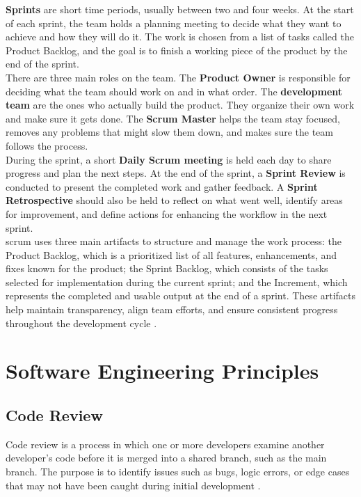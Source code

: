 \textbf{Sprints} are short time periods, usually between two and four weeks. At the start of each sprint, the team holds a planning meeting to decide what they want to achieve and how they will do it. The work is chosen from a list of tasks called the Product Backlog, and the goal is to finish a working piece of the product by the end of the sprint. \\

There are three main roles on the team. The \textbf{Product Owner} is responsible for deciding what the team should work on and in what order. The \textbf{development team} are the ones who actually build the product. They organize their own work and make sure it gets done. The \textbf{Scrum Master} helps the team stay focused, removes any problems that might slow them down, and makes sure the team follows the process.\\

During the sprint, a short \textbf{Daily Scrum meeting} is held each day to share progress and plan the next steps. At the end of the sprint, a \textbf{Sprint Review} is conducted to present the completed work and gather feedback. A \textbf{Sprint Retrospective} should also be held to reflect on what went well, identify areas for improvement, and define actions for enhancing the workflow in the next sprint.\\

\gls{scrum} uses three main artifacts to structure and manage the work process: the Product Backlog, which is a prioritized list of all features, enhancements, and fixes known for the product; the Sprint Backlog, which consists of the tasks selected for implementation during the current sprint; and the Increment, which represents the completed and usable output at the end of a sprint. These artifacts help maintain transparency, align team efforts, and ensure consistent progress throughout the development cycle \cite{scrumguides:scrum}.

\section{Software Engineering Principles}
\label{sec:software-engineering-principles}

\subsection{Code Review}
\label{subsec:code-review}

Code review is a process in which one or more developers examine another developer’s code before it is merged into a shared branch, such as the main branch. The purpose is to identify issues such as bugs, logic errors, or edge cases that may not have been caught during initial development \cite{gitlab:code-review}. \\

